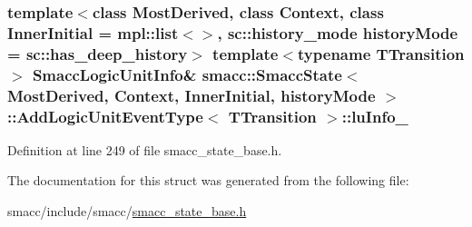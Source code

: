 \subsubsection[{\texorpdfstring{lu\+Info\+\_\+}{luInfo_}}]{\setlength{\rightskip}{0pt plus 5cm}template$<$class Most\+Derived, class Context, class Inner\+Initial = mpl\+::list$<$$>$, sc\+::history\+\_\+mode history\+Mode = sc\+::has\+\_\+deep\+\_\+history$>$ template$<$typename T\+Transition $>$ {\bf Smacc\+Logic\+Unit\+Info}\& {\bf smacc\+::\+Smacc\+State}$<$ Most\+Derived, Context, Inner\+Initial, history\+Mode $>$\+::{\bf Add\+Logic\+Unit\+Event\+Type}$<$ T\+Transition $>$\+::lu\+Info\+\_\+}\hypertarget{structsmacc_1_1SmaccState_1_1AddLogicUnitEventType_a31c27ea945cd0127080c0bae872c028e}{}\label{structsmacc_1_1SmaccState_1_1AddLogicUnitEventType_a31c27ea945cd0127080c0bae872c028e}


Definition at line 249 of file smacc\+\_\+state\+\_\+base.\+h.



The documentation for this struct was generated from the following file\+:\begin{DoxyCompactItemize}
\item 
smacc/include/smacc/\hyperlink{smacc__state__base_8h}{smacc\+\_\+state\+\_\+base.\+h}\end{DoxyCompactItemize}

